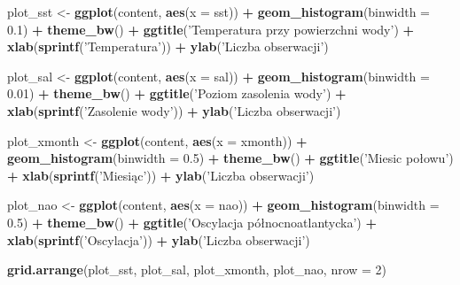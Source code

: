 \documentclass[]{article}
\newenvironment{Shaded}{\begin{snugshade}}{\end{snugshade}}
\newcommand{\DataTypeTok}[1]{\textcolor[rgb]{0.13,0.29,0.53}{#1}}
\newcommand{\DecValTok}[1]{\textcolor[rgb]{0.00,0.00,0.81}{#1}}
\newcommand{\FloatTok}[1]{\textcolor[rgb]{0.00,0.00,0.81}{#1}}
\newcommand{\KeywordTok}[1]{\textcolor[rgb]{0.13,0.29,0.53}{\textbf{#1}}}
\newcommand{\NormalTok}[1]{#1}
\newcommand{\OperatorTok}[1]{\textcolor[rgb]{0.81,0.36,0.00}{\textbf{#1}}}
\newcommand{\StringTok}[1]{\textcolor[rgb]{0.31,0.60,0.02}{#1}}
\begin{document}
\begin{Shaded}
\begin{Highlighting}[]
\NormalTok{plot_sst <-}\StringTok{ }\KeywordTok{ggplot}\NormalTok{(content, }\KeywordTok{aes}\NormalTok{(}\DataTypeTok{x =}\NormalTok{ sst)) }\OperatorTok{+}\StringTok{ }\KeywordTok{geom_histogram}\NormalTok{(}\DataTypeTok{binwidth =} \FloatTok{0.1}\NormalTok{) }\OperatorTok{+}
\StringTok{  }\KeywordTok{theme_bw}\NormalTok{() }\OperatorTok{+}\StringTok{ }\KeywordTok{ggtitle}\NormalTok{(}\StringTok{'Temperatura przy powierzchni wody'}\NormalTok{) }\OperatorTok{+}\StringTok{ }
\StringTok{  }\KeywordTok{xlab}\NormalTok{(}\KeywordTok{sprintf}\NormalTok{(}\StringTok{'Temperatura'}\NormalTok{)) }\OperatorTok{+}\StringTok{ }\KeywordTok{ylab}\NormalTok{(}\StringTok{'Liczba obserwacji'}\NormalTok{)}

\NormalTok{plot_sal <-}\StringTok{ }\KeywordTok{ggplot}\NormalTok{(content, }\KeywordTok{aes}\NormalTok{(}\DataTypeTok{x =}\NormalTok{ sal)) }\OperatorTok{+}\StringTok{ }\KeywordTok{geom_histogram}\NormalTok{(}\DataTypeTok{binwidth =} \FloatTok{0.01}\NormalTok{) }\OperatorTok{+}
\StringTok{  }\KeywordTok{theme_bw}\NormalTok{() }\OperatorTok{+}\StringTok{ }\KeywordTok{ggtitle}\NormalTok{(}\StringTok{'Poziom zasolenia wody'}\NormalTok{) }\OperatorTok{+}\StringTok{ }
\StringTok{  }\KeywordTok{xlab}\NormalTok{(}\KeywordTok{sprintf}\NormalTok{(}\StringTok{'Zasolenie wody'}\NormalTok{)) }\OperatorTok{+}\StringTok{ }\KeywordTok{ylab}\NormalTok{(}\StringTok{'Liczba obserwacji'}\NormalTok{)}

\NormalTok{plot_xmonth <-}\StringTok{ }\KeywordTok{ggplot}\NormalTok{(content, }\KeywordTok{aes}\NormalTok{(}\DataTypeTok{x =}\NormalTok{ xmonth)) }\OperatorTok{+}\StringTok{ }\KeywordTok{geom_histogram}\NormalTok{(}\DataTypeTok{binwidth =} \FloatTok{0.5}\NormalTok{) }\OperatorTok{+}
\StringTok{  }\KeywordTok{theme_bw}\NormalTok{() }\OperatorTok{+}\StringTok{ }\KeywordTok{ggtitle}\NormalTok{(}\StringTok{'Miesic połowu'}\NormalTok{) }\OperatorTok{+}\StringTok{ }
\StringTok{  }\KeywordTok{xlab}\NormalTok{(}\KeywordTok{sprintf}\NormalTok{(}\StringTok{'Miesiąc'}\NormalTok{)) }\OperatorTok{+}\StringTok{ }\KeywordTok{ylab}\NormalTok{(}\StringTok{'Liczba obserwacji'}\NormalTok{)}

\NormalTok{plot_nao <-}\StringTok{ }\KeywordTok{ggplot}\NormalTok{(content, }\KeywordTok{aes}\NormalTok{(}\DataTypeTok{x =}\NormalTok{ nao)) }\OperatorTok{+}\StringTok{ }\KeywordTok{geom_histogram}\NormalTok{(}\DataTypeTok{binwidth =} \FloatTok{0.5}\NormalTok{) }\OperatorTok{+}
\StringTok{  }\KeywordTok{theme_bw}\NormalTok{() }\OperatorTok{+}\StringTok{ }\KeywordTok{ggtitle}\NormalTok{(}\StringTok{'Oscylacja północnoatlantycka'}\NormalTok{) }\OperatorTok{+}\StringTok{ }
\StringTok{  }\KeywordTok{xlab}\NormalTok{(}\KeywordTok{sprintf}\NormalTok{(}\StringTok{'Oscylacja'}\NormalTok{)) }\OperatorTok{+}\StringTok{ }\KeywordTok{ylab}\NormalTok{(}\StringTok{'Liczba obserwacji'}\NormalTok{)}

\KeywordTok{grid.arrange}\NormalTok{(plot_sst, plot_sal, plot_xmonth, plot_nao, }\DataTypeTok{nrow =} \DecValTok{2}\NormalTok{)}
\end{Highlighting}
\end{Shaded}
\end{document}

